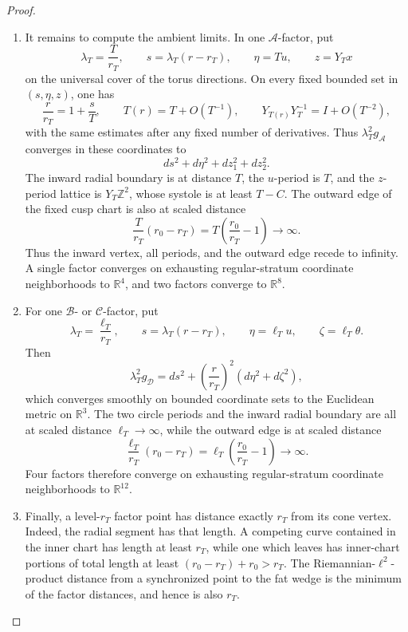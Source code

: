\begin{proof}
\begin{enumerate}[label=\arabic*.,leftmargin=*]
\item It remains to compute the ambient limits.  In one \(\mathcal A\)-factor,
put
\[
 \lambda_T=\frac{T}{r_T},\qquad
 s=\lambda_T(r-r_T),\qquad
 \eta=Tu,\qquad z=Y_Tx
\]
on the universal cover of the torus directions.  On every fixed bounded
set in \((s,\eta,z)\), one has
\[
 \frac r{r_T}=1+\frac sT,
 \qquad
 T(r)=T+O(T^{-1}),
 \qquad
 Y_{T(r)}Y_T^{-1}=I+O(T^{-2}),
\]
with the same estimates after any fixed number of derivatives.  Thus
\(\lambda_T^2g_{\mathcal A}\) converges in these coordinates to
\[
 ds^2+d\eta^2+dz_1^2+dz_2^2.
\]
The inward radial boundary is at distance \(T\), the \(u\)-period is \(T\),
and the \(z\)-period lattice is \(Y_T\mathbb Z^2\), whose systole is at
least \(T-C\).  The outward edge of the fixed cusp chart is also at scaled
distance
\[
 \frac{T}{r_T}(r_0-r_T)
 =T\left(\frac{r_0}{r_T}-1\right)\longrightarrow\infty.
\]
Thus the inward vertex, all periods, and the outward edge recede to
infinity.  A single factor converges on exhausting regular-stratum
coordinate neighborhoods to \(\mathbb R^4\), and two factors converge to
\(\mathbb R^8\).

\item For one \(\mathcal B\)- or \(\mathcal C\)-factor, put
\[
 \lambda_T=\frac{\ell_T}{r_T},\qquad
 s=\lambda_T(r-r_T),\qquad
 \eta=\ell_Tu,\qquad \zeta=\ell_T\theta.
\]
Then
\[
 \lambda_T^2g_{\mathcal D}
 =ds^2+\left(\frac r{r_T}\right)^2
       (d\eta^2+d\zeta^2),
\]
which converges smoothly on bounded coordinate sets to the Euclidean metric
on \(\mathbb R^3\).  The two circle periods and the inward radial boundary
are all at scaled distance \(\ell_T\to\infty\), while the outward edge is
at scaled distance
\[
 \frac{\ell_T}{r_T}(r_0-r_T)
 =\ell_T\left(\frac{r_0}{r_T}-1\right)\longrightarrow\infty.
\]
Four factors therefore converge on exhausting regular-stratum coordinate
neighborhoods to \(\mathbb R^{12}\).

\item Finally, a level-\(r_T\) factor point has distance exactly \(r_T\) from its
cone vertex.  Indeed, the radial segment has that length.  A competing
curve contained in the inner chart has length at least \(r_T\), while one
which leaves has inner-chart portions of total length at least
\((r_0-r_T)+r_0>r_T\).  The Riemannian-\(\ell^2\)-product distance from a
synchronized point to the fat wedge is the minimum of the factor
distances, and hence is also \(r_T\).


\end{enumerate}
\end{proof}
